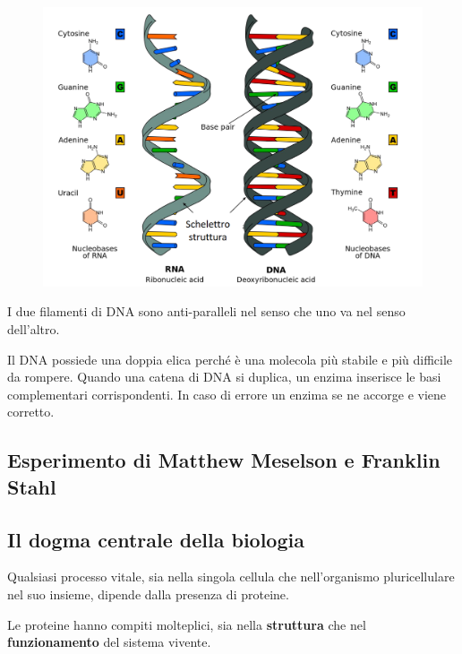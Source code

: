 \documentclass[a4paper]{article}
\begin{document}
\begin{center}
\begin{figure}[th]
    \centering
    \includegraphics[width=\textwidth]{./xna.png}
\end{figure}
\end{center}

I due filamenti di DNA sono anti-paralleli nel senso
che uno va nel senso dell'altro.

Il DNA possiede una doppia elica perché è una molecola
più stabile e più difficile da rompere.
Quando una catena di DNA si duplica, un enzima
inserisce le basi complementari corrispondenti.
In caso di errore un enzima se ne accorge e viene corretto.

\subsection{Esperimento di Matthew Meselson e Franklin Stahl}


\pagebreak

\subsection{Il dogma centrale della biologia}

Qualsiasi processo vitale, sia nella singola cellula che nell'organismo pluricellulare nel suo
insieme, dipende dalla presenza di proteine.

Le proteine hanno compiti molteplici, sia nella \textbf{struttura}
che nel \textbf{funzionamento} del sistema
vivente.
\end{document}
